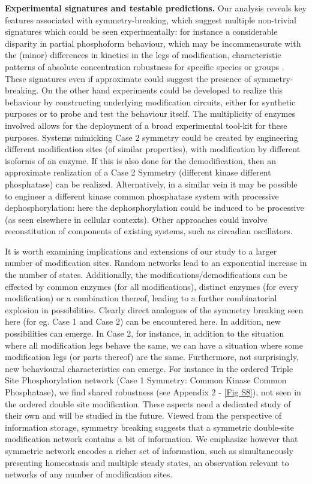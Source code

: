 \documentclass[9pt,lineno]{elife}
\begin{document}
{\bf Experimental signatures and testable predictions.} Our analysis reveals key features associated with symmetry-breaking, which suggest multiple non-trivial signatures which could be seen experimentally: for instance a considerable disparity in partial phosphoform behaviour, which may be incommensurate with the (minor) differences in kinetics in the legs of modification, characteristic patterns of absolute concentration robustness for specific  species or groups . These signatures even if approximate  could suggest the presence of symmetry-breaking. On the other hand experiments could be developed to realize this behaviour by constructing underlying modification circuits, either for synthetic purposes or to probe and test the behaviour itself. The multiplicity of enzymes involved allows for the deployment of a broad experimental tool-kit for these purposes.
Systems mimicking Case 2 symmetry could be created by engineering different modification sites (of similar properties), with modification by different isoforms of an enzyme. If this is also done for the demodification, then an approximate realization of a Case 2 Symmetry (different kinase different phosphatase) can be realized. Alternatively, in a similar vein it may be possible to engineer a different kinase common phosphatase system with processive dephosphorylation: here the dephosphorylation could be induced to be processive (as seen elsewhere in cellular contexts). Other approaches could involve reconstitution of components of existing systems, such as circadian oscillators.

It is worth examining implications and extensions of our study to a larger number of modification sites. Random networks lead to an exponential increase in the number of states. Additionally, the modifications/demodifications can be effected by common enzymes (for all modifications), distinct enzymes (for every modification) or a combination thereof, leading to a further combinatorial explosion in possibilities. Clearly direct analogues of the symmetry breaking seen here (for eg. Case 1 and Case 2) can be encountered here. In addition, new possibilities can emerge.
In Case 2, for instance, in addition to the situation where all modification legs behave the same, we can have a situation where some modification legs (or parts thereof) are the same.
Furthermore, not surprisingly, new behavioural characteristics can emerge. For instance in the ordered Triple Site Phosphorylation network (Case 1 Symmetry: Common Kinase Common Phosphatase), we find shared robustness (see Appendix 2 - \cref{Fig S8}), not seen in the ordered double site modification. These aspects need a dedicated study of their own and will be studied in the future. Viewed from the perspective of information storage,
symmetry breaking suggests that a symmetric double-site modification network contains a bit of information. We emphasize however that symmetric  network encodes a richer set of information, such as simultaneously presenting homeostasis and multiple steady states, an observation relevant to networks of any number of modification sites.
 
\end{document}
